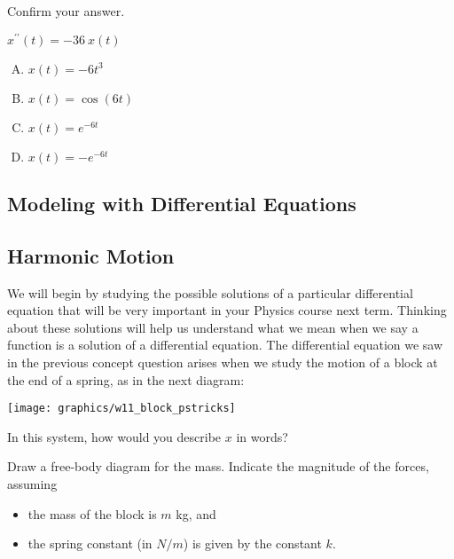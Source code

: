 \documentclass[12pt]{amsart}
\begin{document}
\newpage

\begin{problem}
Confirm your answer.
\end{problem}
$x^{\prime\prime} (t) = - 36 ~x(t)$ 
\hfill\begin{minipage}[t]{0.4\linewidth}
\begin{enumerate}[A.]
\item $x(t)=-6 t^3$ 
\item $x(t)=\cos(6 t)$ 
\item $x(t)=e^{-6t}$ 
\item $x(t)=-e^{-6t}$
\end{enumerate}
\end{minipage}

\newpage
{}
\subsection*{Modeling with Differential Equations}

\subsection*{Harmonic Motion} 
We will begin by studying the possible
solutions of a particular differential equation that will be very
important in your Physics course next term. Thinking about these
solutions will help us understand what we mean when we say a function
is a solution of a differential equation.  The differential equation
we saw in the previous concept question arises when we study the
motion of a block at the end of a spring, as in the next diagram:
\begin{center}
\texttt{[image: graphics/w11\_block\_pstricks]}
\end{center}

 In this system, how would you describe $x$ in words?


\newpage
\begin{problem}
  
 Draw a free-body diagram for the mass.  Indicate the magnitude of the forces, assuming 
\begin{itemize}
\item the mass of the block is $m$ kg, and
\item the spring constant (in $N/m$) is
  given by the constant $k$.
\end{itemize}
\end{problem}
\end{document}
